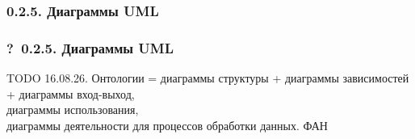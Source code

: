 \documentclass[mathserif,12pt,aspectratio=169]{beamer}
\def\emразделенной{\em разделенной}
\def\em#1{\it\color{blue}#1}
\def\DMref#1#2{{\color{blue}\underline{\hyperlink{#2}{#1}}}}
\def\TODO#1{{\color{gray} TODO {#1}}}
\def\Qm{{\color{brown}\textbf{?}\ }}
\begin{document}

\subsubsection{0.2.5. Диаграммы UML}\label{0.2.5.}
\begin{frame}
\frametitle{\Qm 0.2.5. Диаграммы UML}

\TODO{ 16.08.26. Онтологии = диаграммы структуры + 
диаграммы зависимостей + диаграммы вход-выход, \\
диаграммы использования, \\
диаграммы деятельности для процессов обработки данных. ФАН}

\end{frame}
\end{document}
